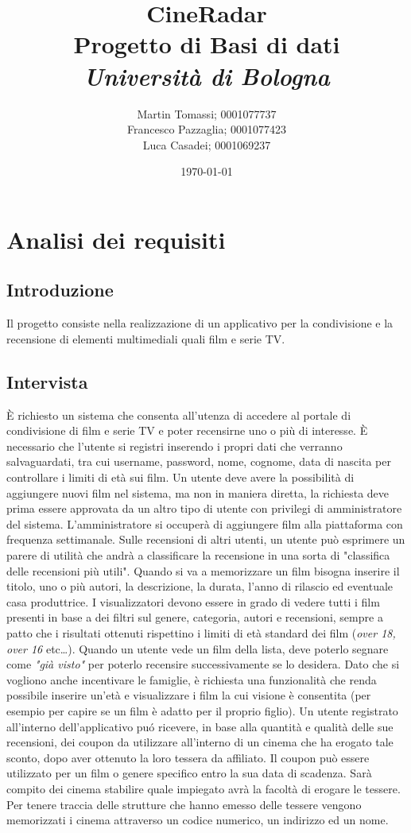 \documentclass[a4paper,12pt]{report}
\title{\textbf{CineRadar}\\Progetto di Basi di dati\\\textit{Università di Bologna}}
\author{Martin Tomassi; 0001077737\\Francesco Pazzaglia; 0001077423\\Luca Casadei; 0001069237}
\date{\today}
\begin{document}
	\maketitle
	\tableofcontents
	\chapter{Analisi dei requisiti}
	\section{Introduzione}
	Il progetto consiste nella realizzazione di un applicativo per la condivisione e la recensione di elementi multimediali quali film e serie TV.
	\section{Intervista}
	È richiesto un sistema che consenta all'utenza di accedere al portale di condivisione di film e serie TV e poter recensirne uno o più di interesse. È necessario che l'utente si registri inserendo i propri dati che verranno salvaguardati, tra cui username, password, nome, cognome, data di nascita per controllare i limiti di età sui film. Un utente deve avere la possibilità di aggiungere nuovi film nel sistema, ma non in maniera diretta, la richiesta deve prima essere approvata da un altro tipo di utente con privilegi di amministratore del sistema. L'amministratore si occuperà di aggiungere film alla piattaforma con frequenza settimanale. Sulle recensioni di altri utenti, un utente può esprimere un parere di utilità che andrà a classificare la recensione in una sorta di "classifica delle recensioni più utili". Quando si va a memorizzare un film bisogna inserire il titolo, uno o più autori, la descrizione, la durata, l'anno di rilascio ed eventuale casa produttrice. I visualizzatori devono essere in grado di vedere tutti i film presenti in base a dei filtri sul genere, categoria, autori e recensioni, sempre a patto che i risultati ottenuti rispettino i limiti di età standard dei film (\textit{over 18, over 16} etc\dots). Quando un utente vede un film della lista, deve poterlo segnare come \textit{"già visto"} per poterlo recensire successivamente se lo desidera. Dato che si vogliono anche incentivare le famiglie, è richiesta una funzionalità che renda possibile inserire un'età e visualizzare i film la cui visione è consentita (per esempio per capire se un film è adatto per il proprio figlio). Un utente registrato all'interno dell'applicativo puó ricevere, in base alla quantità e qualità delle sue recensioni, dei coupon da utilizzare all'interno di un cinema che ha erogato tale sconto, dopo aver ottenuto la loro tessera da affiliato. Il coupon può essere utilizzato per un film o genere specifico entro la sua data di scadenza. Sarà compito dei cinema stabilire quale impiegato avrà la facoltà di erogare le tessere. Per tenere traccia delle strutture che hanno emesso delle tessere vengono memorizzati i cinema attraverso un codice numerico, un indirizzo ed un nome.
\end{document}
